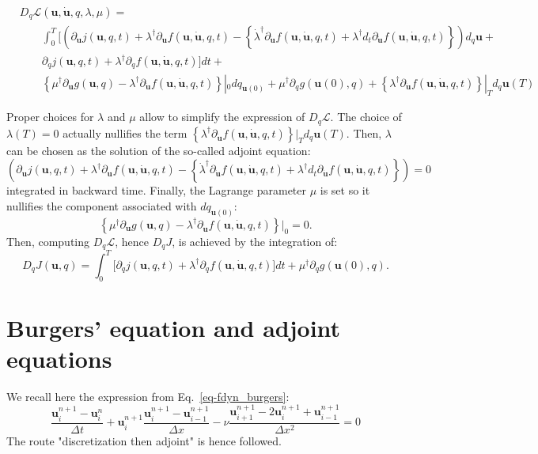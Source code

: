 \documentclass[10pt,openany,onecolumn,a4wide,pof]{article}
\newcommand{\gras}[1]{\boldsymbol{#1}}
\newcommand{\mypar}[1]{\left(#1\right)}
\newcommand{\mya}[1]{\left\{#1\right\}}
\newcommand{\fdyn}{f} %
\newcommand{\costf}{J} %
\newcommand{\costff}{j} %
\newcommand{\lag}{\mathcal{L}} %
\newcommand{\point}{\gras{u}} %
\begin{document}
\begin{equation}
\begin{split}
&D_q\lag\mypar{\point,\dot{\point},q,\lambda,\mu} = \\
& \qquad \int_0^T  \bigg[  \mypar{\partial_{\point}\costff(\point,q,t) + \lambda^{\dagger} \partial_{\point}  \fdyn(\point,\dot{\point},q,t) - \mya{\dot{\lambda}^{\dagger}\partial_{\dot{\point}} \fdyn(\point,\dot{\point},q,t) + \lambda^{\dagger}d_t\partial_{\dot{\point}}\fdyn(\point,\dot{\point},q,t)}} d_q \point   +\\
& \qquad \partial_{q} \costff(\point,q,t)    + \lambda^{\dagger}\partial_q\fdyn(\point,\dot{\point},q,t) \bigg] dt + \\
& \qquad \mya{\mu^{\dagger} \partial_{\point} g(\point,q) - \lambda^{\dagger}\partial_{\dot{\point}} \fdyn(\point,\dot{\point},q,t) }|_0 dq_{\point(0)}  + \mu^{\dagger} \partial_q g(\point(0),q) + \mya{\lambda^{\dagger}\partial_{\dot{\point}} \fdyn(\point,\dot{\point},q,t)}|_T d_q \point(T)
\end{split}
\label{eq-deriv_ord}
\end{equation}

Proper choices for $\lambda$ and $\mu$ allow to simplify the expression of $D_q\lag$.
The choice of $\lambda\mypar{T} = 0$ actually nullifies the term $\mya{\lambda^{\dagger}\partial_{\dot{\point}} \fdyn(\point,\dot{\point},q,t)}|_T d_q \point(T)$.
Then, $\lambda$ can be chosen as the solution of the so-called adjoint equation:
$$
\mypar{\partial_{\point}\costff(\point,q,t) + \lambda^{\dagger} \partial_{\point}  \fdyn(\point,\dot{\point},q,t) - \mya{\dot{\lambda}^{\dagger}\partial_{\dot{\point}} \fdyn(\point,\dot{\point},q,t) + \lambda^{\dagger}d_t\partial_{\dot{\point}}\fdyn(\point,\dot{\point},q,t)}} = 0 
$$
integrated in backward time. 
Finally, the Lagrange parameter $\mu$ is set so it nullifies the component associated with $dq_{\point(0)}$:
$$ \mya{\mu^{\dagger} \partial_{\point} g(\point,q) - \lambda^{\dagger}\partial_{\dot{\point}} \fdyn(\point,\dot{\point},q,t) }|_0 = 0.$$
Then, computing $D_q\lag$, hence $ D_q\costf$, is achieved by the integration of:
\begin{equation}
D_q\costf\mypar{\point,q} = \int_0^T  \bigg[  \partial_{q} \costff(\point,q,t)    + \lambda^{\dagger}\partial_q\fdyn(\point,\dot{\point},q,t) \bigg] dt +   \mu^{\dagger} \partial_q g(\point(0),q).
\label{eq-J_adj}
\end{equation}


\section{Burgers' equation and adjoint equations}
\label{an-burgers}
We recall here the expression from Eq.~\eqref{eq-fdyn_burgers}:
$$ \frac{\point^{n+1}_i - \point^{n}_i}{\Delta t} + \point^{n+1}_i \frac{\point^{n+1}_i - \point^{n+1}_{i-1}}{\Delta x} - \nu \frac{\point^{n+1}_{i+1} -2 \point^{n+1}_i + \point^{n+1}_{i-1}}{\Delta x ^2} = 0 $$
The route "discretization then adjoint" is hence followed.
\end{document}

